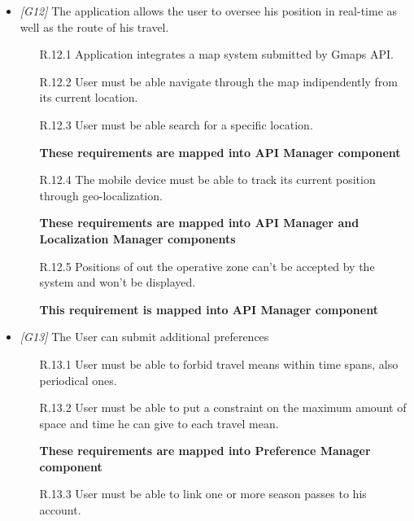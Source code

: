 \begin{itemize}
	\item \textit{[G12]} The application allows the user to oversee his position in real-time as well as the route of his travel.

		\begin{itemize}

			\item [R.12.1] Application integrates a map system submitted by Gmaps API.

			\item [R.12.2] User must be able navigate through the map indipendently from its current location.

			\item [R.12.3] User must be able search for a specific location.

			\textbf{These requirements are mapped into API Manager component}

			\item [R.12.4] The mobile device must be able to track its current position through geo-localization.
			
			\textbf{These requirements are mapped into API Manager and Localization Manager components}

			\item [R.12.5] Positions of out the operative zone can't be accepted by the system and won't be displayed.
			
			\textbf{This requirement is mapped into API Manager component}

		\end{itemize}





	\item \textit{[G13]} The User can submit additional preferences

		\begin{itemize}

			\item[R.13.1] User must be able to forbid travel means within time spans, also periodical ones.

			\item[R.13.2] User must be able to put a constraint on the maximum amount of space and time he can give to each travel mean.
			
			\textbf{These requirements are mapped into Preference Manager component}

			\item[R.13.3] User must be able to link one or more season passes to his account.


\end{itemize}
\end{itemize}
